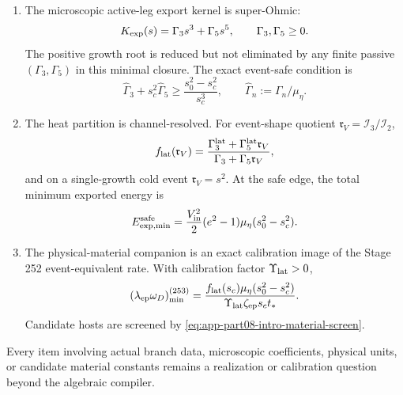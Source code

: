 \begin{theorem}
\begin{enumerate}[leftmargin=2.2em]
\begin{equation}
  +
  \frac{\lambda_{\rm eff}^{2}g_{UV}\chi_{\rm peak}}{\mu_\eta}.
  \end{equation}
  Under the declared characteristic closure this is a one-sided lower edge.
  \item The microscopic active-leg export kernel is super-Ohmic:
  \begin{equation}
  \label{eq:app-part08-main-kexp}
  K_{\rm exp}(s)=\Gamma_3s^3+\Gamma_5s^5,
  \qquad
  \Gamma_3,\Gamma_5\ge0.
  \end{equation}
  The positive growth root is reduced but not eliminated by any finite passive \((\Gamma_3,\Gamma_5)\) in this minimal closure.  The exact event-safe condition is
  \begin{equation}
  \label{eq:app-part08-main-safe-half-plane}
  \widehat\Gamma_3+s_c^2\widehat\Gamma_5
  \ge
  \frac{s_0^2-s_c^2}{s_c^3},
  \qquad
  \widehat\Gamma_n:=\Gamma_n/\mu_\eta.
  \end{equation}
  \item The heat partition is channel-resolved.  For event-shape quotient \(\mathfrak r_V=\mathcal I_3/\mathcal I_2\),
  \begin{equation}
  \label{eq:app-part08-main-heat-fraction}
  f_{\rm lat}(\mathfrak r_V)=
  \frac{\Gamma_3^{\rm lat}+\Gamma_5^{\rm lat}\mathfrak r_V}{\Gamma_3+\Gamma_5\mathfrak r_V},
  \end{equation}
  and on a single-growth cold event \(\mathfrak r_V=s^2\).  At the safe edge, the total minimum exported energy is
  \begin{equation}
  \label{eq:app-part08-main-safe-energy}
  E_{\rm exp,min}^{\rm safe}
  =
  \frac{V_{\rm in}^{2}}{2}(e^2-1)\mu_\eta(s_0^2-s_c^2).
  \end{equation}
  \item The physical-material companion is an exact calibration image of the Stage 252 event-equivalent rate.  With calibration factor \(\Upsilon_{\rm lat}>0\),
  \begin{equation}
  \label{eq:app-part08-main-ep-threshold}
  (\lambda_{\rm ep}\omega_D)_{\min}^{(253)}
  =
  \frac{f_{\rm lat}(s_c)\mu_\eta(s_0^2-s_c^2)}
  {\Upsilon_{\rm lat}\zeta_{\rm ep}s_ct_*}.
  \end{equation}
  Candidate hosts are screened by \cref{eq:app-part08-intro-material-screen}.
\end{enumerate}
Every item involving actual branch data, microscopic coefficients, physical units, or candidate material constants remains a realization or calibration question beyond the algebraic compiler.
\end{theorem}


